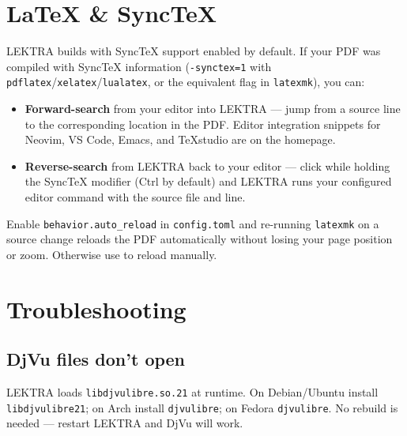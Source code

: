 \documentclass[a4paper,12pt]{article}
\begin{document}

\section{LaTeX \& SyncTeX}

LEKTRA builds with SyncTeX support enabled by default. If your PDF was compiled with SyncTeX information (\texttt{-synctex=1} with \texttt{pdflatex}/\texttt{xelatex}/\texttt{lualatex}, or the equivalent flag in \texttt{latexmk}), you can:

\begin{itemize}[leftmargin=*]
    \item \textbf{Forward-search} from your editor into LEKTRA — jump from a source line to the corresponding location in the PDF. Editor integration snippets for Neovim, VS Code, Emacs, and TeXstudio are on the homepage.
    \item \textbf{Reverse-search} from LEKTRA back to your editor — click while holding the SyncTeX modifier (Ctrl by default) and LEKTRA runs your configured editor command with the source file and line.
\end{itemize}

Enable \texttt{behavior.auto\_reload} in \texttt{config.toml} and re-running \texttt{latexmk} on a source change reloads the PDF automatically without losing your page position or zoom. Otherwise use  to reload manually.

\section{Troubleshooting}

\subsection{DjVu files don't open}
LEKTRA loads \texttt{libdjvulibre.so.21} at runtime. On Debian/Ubuntu install \texttt{libdjvulibre21}; on Arch install \texttt{djvulibre}; on Fedora \texttt{djvulibre}. No rebuild is needed — restart LEKTRA and DjVu will work.
\end{document}
